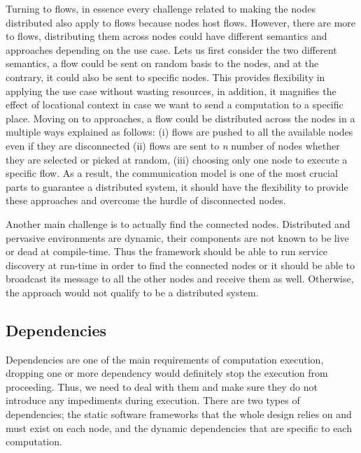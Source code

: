 
Turning to flows, in essence every challenge related to making the nodes distributed also apply to flows because nodes host flows. However, there are more to flows, distributing them across nodes could have different semantics and approaches depending on the use case.
 Lets us first consider the two different semantics, a flow could be sent on random basis to the nodes, and at the contrary, it could also be sent to specific nodes. This provides flexibility in applying the use case without wasting resources, in addition, it magnifies the effect of locational context in case we want to send a computation to a specific place.
 Moving on to approaches, a flow could be distributed across the nodes in a multiple ways explained as follows: (i) flows are pushed to all the available nodes even if they are disconnected (ii) flows are sent to \textit{n} number of nodes whether they are selected or picked at random, (iii) choosing only one node to execute a specific flow. As a result, the communication model is one of the most crucial parts to guarantee a distributed system, it should have the flexibility to provide these approaches and overcome the hurdle of disconnected nodes.
 

Another main challenge is to actually find the connected nodes. Distributed and pervasive environments are dynamic, their components are not known to be live or dead at compile-time. Thus the framework should be able to run service discovery at run-time in order to find the connected nodes or it should be able to broadcast its message to all the other nodes and receive them as well. Otherwise, the approach would not qualify to be a distributed system. 






\newpage


\subsection{Dependencies}

Dependencies are one of the main requirements of computation execution, dropping one or more dependency would definitely stop the execution from proceeding. Thus, we need to deal with them and make sure they do not introduce any impediments during execution.  There are two types of dependencies; the static software frameworks that the whole design relies on and must exist on each node, and the dynamic dependencies that are specific to each computation.

